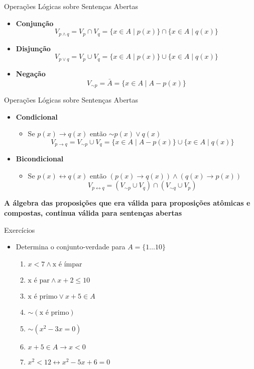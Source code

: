 \begin{frame}[t]{Operações Lógicas sobre Sentenças Abertas}
	\begin{itemize}
	\item {\bf Conjunção} $$V_{p \wedge q} = V_p \cap V_q = \{ x \in A \mid p(x) \} \cap \{ x \in A \mid q(x) \}$$

	\item {\bf Disjunção}  $$V_{p \vee q} = V_p \cup V_q = \{ x \in A \mid p(x) \} \cup \{ x \in A \mid q(x) \}$$

	\item {\bf Negação} $$V_{\sim p} = \bar{A} = \{ x \in A \mid A - p(x) \}$$
	\end{itemize}
\end{frame}

\begin{frame}[t]{Operações Lógicas sobre Sentenças Abertas}
	\begin{itemize}
	\item {\bf Condicional} 
	\begin{itemize}
	\item Se $p(x) \rightarrow q(x)$ então $\sim p(x) \vee q(x)$
	$$V_{p \rightarrow q} = V_{\sim p} \cup V_q = \{ x \in A \mid A - p(x) \} \cup \{ x \in A \mid q(x) \}$$
	\end{itemize}

	\item {\bf Bicondicional} 
	\begin{itemize}
	\item Se $p(x) \leftrightarrow q(x)$ então $(p(x) \rightarrow q(x)) \wedge (q(x) \rightarrow p(x))$
	$$V_{p \leftrightarrow q} = (V_{\sim p} \cup V_q) \cap (V_{\sim q} \cup V_p)$$
	\end{itemize}
	\end{itemize}

	\hskip 1.5cm

	\begin{center}
	{\bf A álgebra das proposições que era válida para proposições atômicas e compostas, continua válida para sentenças abertas}
	\end{center}
\end{frame}

\begin{frame}[t]{Exercícios}
	\begin{itemize}
	\item Determina o conjunto-verdade para $A = \{1 \ldots 10 \}$
	\begin{enumerate}
	\item $x < 7 \wedge \mbox{x é ímpar}$
	\item $\mbox{x é par} \wedge x + 2 \leq 10$
	\item $\mbox{x é primo} \vee x + 5 \in A$
	\item $\sim (\mbox{x é primo})$
	\item $\sim (x^2 - 3x = 0)$
	\item $x + 5 \in A \rightarrow x < 0$
	\item $x^2 < 12 \leftrightarrow x^2 - 5x + 6 = 0$
	\end{enumerate}
	\end{itemize}
\end{frame}

